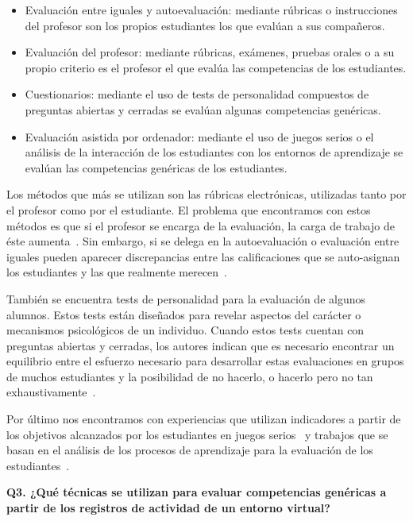 \begin{itemize}
\item Evaluación entre iguales y autoevaluación: mediante rúbricas o instrucciones del profesor son los propios estudiantes los que evalúan a sus compañeros.
\item Evaluación del profesor: mediante rúbricas, exámenes, pruebas orales o a su propio criterio es el profesor el que evalúa las competencias de los estudiantes.
\item Cuestionarios: mediante el uso de tests de personalidad compuestos de preguntas abiertas y cerradas se evalúan algunas competencias genéricas.
\item Evaluación asistida por ordenador: mediante el uso de juegos serios o el análisis de la interacción de los estudiantes con los entornos de aprendizaje se evalúan las competencias genéricas de los estudiantes.
\end{itemize}

Los métodos que más se utilizan son las rúbricas electrónicas, utilizadas tanto por el profesor como por el estudiante. El problema que encontramos con estos métodos es que si el profesor se encarga de la evaluación, la carga de trabajo de éste aumenta~\cite{lacuesta2009active,barbera2011design}. Sin embargo, si se delega en la autoevaluación o evaluación entre iguales pueden aparecer discrepancias entre las calificaciones que se auto-asignan los estudiantes y las que realmente merecen~\cite{carreras2013promotion}. 

También se encuentra tests de personalidad para la evaluación de algunos alumnos. Estos tests están diseñados para revelar aspectos del carácter o mecanismos psicológicos de un individuo. Cuando estos tests cuentan con preguntas abiertas y cerradas, los autores indican que es necesario encontrar un equilibrio entre el esfuerzo necesario para desarrollar estas evaluaciones en grupos de muchos estudiantes y la posibilidad de no hacerlo, o hacerlo pero no tan exhaustivamente~\cite{vizcarro2013assessment}.

Por último nos encontramos con experiencias que utilizan indicadores a partir de los objetivos alcanzados por los estudiantes en juegos serios~\cite{djaouti2011classifying,bedek2011behavioral} y trabajos que se basan en el análisis de los procesos de aprendizaje para la evaluación de los estudiantes~\cite{rayon2014web,fidalgo:2015}.

\bigskip
\textbf{Q3. ¿Qué técnicas se utilizan para evaluar competencias genéricas a partir de los registros de actividad de un entorno virtual?}

